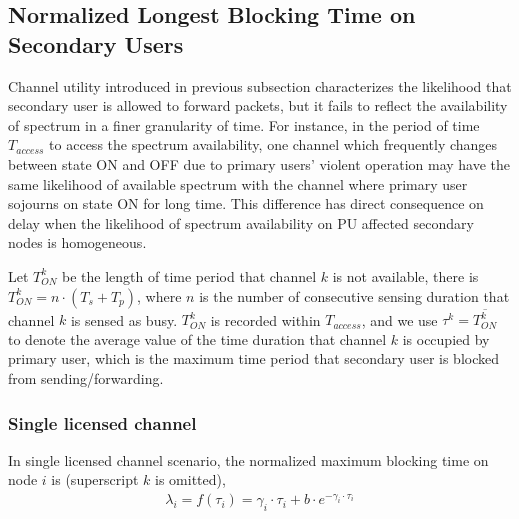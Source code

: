 \subsection{Normalized Longest Blocking Time on Secondary Users}
\label{BT}
Channel utility introduced in previous subsection characterizes the likelihood that secondary user is allowed to forward packets, but it fails to reflect the availability of spectrum in a finer granularity of time.
For instance, in the period of time $T_{access}$ to access the spectrum availability, one channel which frequently changes between state ON and OFF due to primary users' violent operation may have the same likelihood of available spectrum with the channel where primary user sojourns on state ON for long time.
This difference has direct consequence on delay when the likelihood of spectrum availability on PU affected secondary nodes is homogeneous.

Let ${T_{ON}^k}$ be the length of time period that channel $k$ is not available, there is ${T_{ON}^k} = n\cdot (T_s+T_p)$, where $n$ is the number of consecutive sensing duration that channel $k$ is sensed as busy.
${T_{ON}^k}$ is recorded within $T_{access}$, and we use $\tau^k = \overline {T_{ON}^k}$ to denote the average value of the time duration that channel $k$ is occupied by primary user, which is the maximum time period that secondary user is blocked from sending/forwarding.

\subsubsection*{Single licensed channel}
In single licensed channel scenario, the normalized maximum blocking time on node $i$ is (superscript $k$ is omitted), 
\begin{equation}
\label{eq:SingleChannel_blockingtime}
\begin{aligned}
\lambda_i = f(\tau_i) = \gamma_i\cdot \tau_i + b\cdot e^{-\gamma_i\cdot \tau_i}
\end{aligned}
\end{equation}


